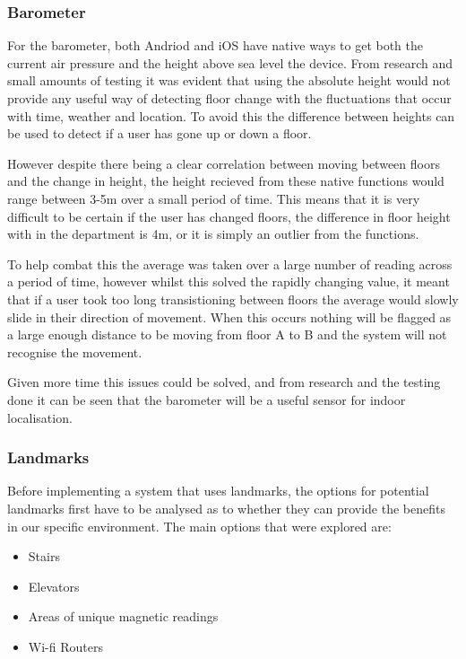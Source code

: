 \documentclass[12pt,a4paper]{report}
\begin{document}
\subsubsection{Barometer}

For the barometer, both Andriod and iOS have native ways to get both the current air pressure and the height above sea level the device. From research and small amounts of testing it was evident that using the absolute height would not provide any useful way of detecting floor change with the fluctuations that occur with time, weather and location. To avoid this the difference between heights can be used to detect if a user has gone up or down a floor. 

However despite there being a clear correlation between moving between floors and the change in height, the height recieved from these native functions would range between 3-5m over a small period of time. This means that it is very difficult to be certain if the user has changed floors, the difference in floor height with in the department is 4m, or it is simply an outlier from the functions. 

To help combat this the average was taken over a large number of reading across a period of time, however whilst this solved the rapidly changing value, it meant that if a user took too long transistioning between floors the average would slowly slide in their direction of movement. When this occurs nothing will be flagged as a large enough distance to be moving from floor A to B and the system will not recognise the movement. 

Given more time this issues could be solved, and from research and the testing done it can be seen that the barometer will be a useful sensor for indoor localisation.

\subsubsection{Landmarks}

Before implementing a system that uses landmarks, the options for potential landmarks first have to be analysed as to whether they can provide the benefits in our specific environment. The main options that were explored are:

\begin{itemize}
	\item Stairs
	\item Elevators
	\item Areas of unique magnetic readings
	\item Wi-fi Routers
\end{itemize}
\end{document}
